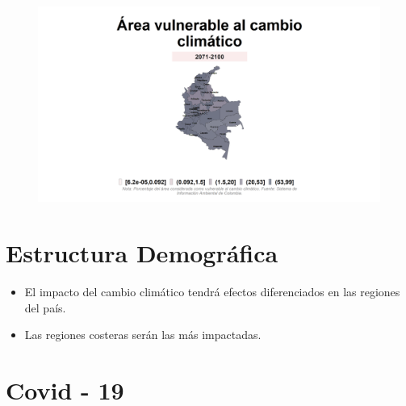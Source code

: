     \begin{figure}[H]
        \caption[Área vulnerable al cambio climático por departamentos ]{\label{cambio_climatico_dptos} }
        \begin{center}
        \includegraphics[width=\textwidth,keepaspectratio]{img/var_299_map.png}
        \end{center}
    \end{figure}


\section{Estructura Demográfica}

    \begin{tcolorbox}[enhanced, colback=mycolor,colframe=mycolor,drop fuzzy shadow,watermark color=white,
                        title=Principales Resultados]
    
            \begin{itemize}
                    \item El impacto del cambio climático tendrá efectos diferenciados en las regiones del país.
                    \item Las regiones costeras serán las más impactadas.
            \end{itemize}
     
    \end{tcolorbox}

\section{Covid - 19}

